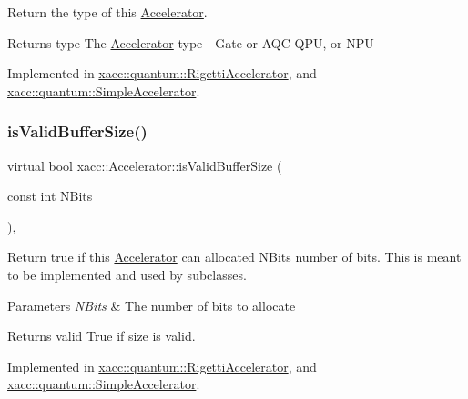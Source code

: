 Return the type of this \hyperlink{a01111}{Accelerator}.

\begin{DoxyReturn}{Returns}
type The \hyperlink{a01111}{Accelerator} type -\/ Gate or A\+QC Q\+PU, or N\+PU 
\end{DoxyReturn}


Implemented in \hyperlink{a00939_aab0d4674da5273d55407b9ab77cde890}{xacc\+::quantum\+::\+Rigetti\+Accelerator}, and \hyperlink{a00959_ad76eeb0bbd7de21aad5bd20d20970a98}{xacc\+::quantum\+::\+Simple\+Accelerator}.

\mbox{\label{a01111_ae51584850faeec77299058383977ddeb}} 
\subsubsection{\texorpdfstring{is\+Valid\+Buffer\+Size()}{isValidBufferSize()}}
{\footnotesize\ttfamily virtual bool xacc\+::\+Accelerator\+::is\+Valid\+Buffer\+Size (\begin{DoxyParamCaption}\item[{const int}]{N\+Bits }\end{DoxyParamCaption})\hspace{0.3cm}{\ttfamily [protected]}, {}}

Return true if this \hyperlink{a01111}{Accelerator} can allocated N\+Bits number of bits. This is meant to be implemented and used by subclasses.


\begin{DoxyParams}{Parameters}
{\em N\+Bits} & The number of bits to allocate \\
\hline
\end{DoxyParams}
\begin{DoxyReturn}{Returns}
valid True if size is valid. 
\end{DoxyReturn}


Implemented in \hyperlink{a00939_a61352c07062597aad2393fbeed4cc025}{xacc\+::quantum\+::\+Rigetti\+Accelerator}, and \hyperlink{a00959_a60b9db2d6aed235857c45413a070338e}{xacc\+::quantum\+::\+Simple\+Accelerator}.

\mbox{\label{a01111_ac3e781f42ec25e460174d4c41ea26b94}} 

